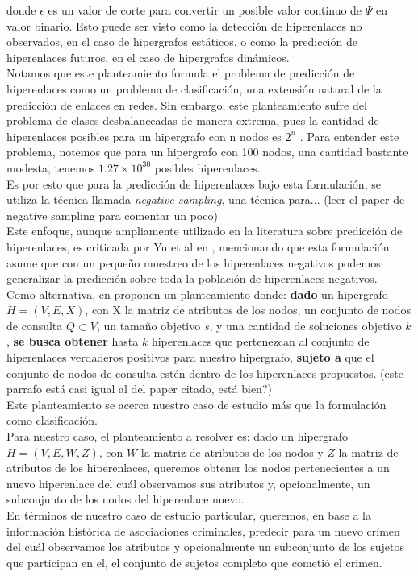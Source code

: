 donde $\epsilon$ es un valor de corte para convertir un posible valor continuo de $\Psi$ en valor binario. Esto puede ser visto como la detección de hiperenlaces no observados, en el caso de hipergrafos estáticos, o como la predicción de hiperenlaces futuros, en el caso de hipergrafos dinámicos.\\

Notamos que este planteamiento formula el problema de predicción de hiperenlaces como un problema de clasificación, una extensión natural de la predicción de enlaces en redes. Sin embargo, este planteamiento sufre del problema de clases desbalanceadas de manera extrema, pues la cantidad de hiperenlaces posibles para un hipergrafo con n nodos es $2^n$ \cite{Prasanna_2020} \cite{Hwang_2022}. Para entender este problema, notemos que para un hipergrafo con 100 nodos, una cantidad bastante modesta, tenemos $1.27 \times 10^{30}$ posibles hiperenlaces.\\

Es por esto que para la predicción de hiperenlaces bajo esta formulación, se utiliza la técnica llamada \textit{negative sampling}, una técnica para... (leer el paper de negative sampling para comentar un poco)\\

Este enfoque, aunque ampliamente utilizado en la literatura sobre predicción de hiperenlaces, es criticada por Yu et al en \cite{Yu_2024}, mencionando que esta formulación asume que con un pequeño muestreo de los hiperenlaces negativos podemos generalizar la predicción sobre toda la población de hiperenlaces negativos.\\

Como alternativa, en \cite{Yu_2024} proponen un planteamiento donde: \textbf{dado} un hipergrafo $H = (V,E,X)$, con X la matriz de atributos de los nodos, un conjunto de nodos de consulta $Q \subset V$, un tamaño objetivo $s$, y una cantidad de soluciones objetivo $k$, \textbf{se busca obtener} hasta $k$ hiperenlaces que pertenezcan al conjunto de hiperenlaces verdaderos positivos para nuestro hipergrafo, \textbf{sujeto a} que el conjunto de nodos de consulta estén dentro de los hiperenlaces propuestos. (este parrafo está casi igual al del paper citado, está bien?)\\ 

Este planteamiento se acerca nuestro caso de estudio más que la formulación como clasificación.\\

Para nuestro caso, el planteamiento a resolver es: dado un hipergrafo $H=(V,E,W,Z)$, con $W$ la matriz de atributos de los nodos y $Z$ la matriz de atributos de los hiperenlaces, queremos obtener los nodos pertenecientes a un nuevo hiperenlace del cuál observamos sus atributos y, opcionalmente, un subconjunto de los nodos del hiperenlace nuevo. \\

En términos de nuestro caso de estudio particular, queremos, en base a la información histórica de asociaciones criminales, predecir para un nuevo crímen del cuál observamos los atributos y opcionalmente un subconjunto de los sujetos que participan en el, el conjunto de sujetos completo que cometió el crimen.